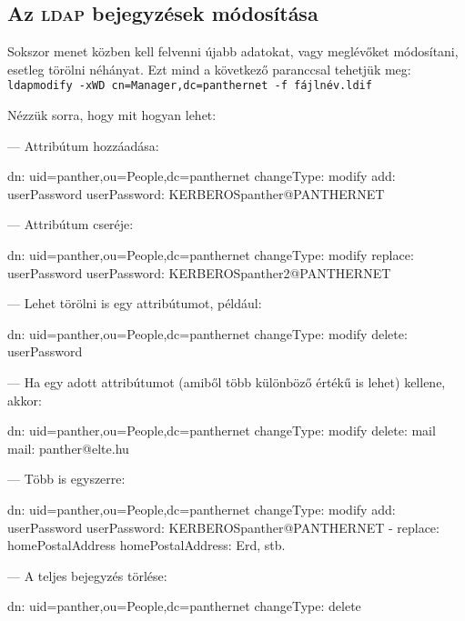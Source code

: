 \subsection{Az \textsc{ldap} bejegyzések módosítása}

Sokszor menet közben kell felvenni újabb adatokat, vagy meglévőket módosítani, esetleg törölni néhányat. Ezt mind a
következő paranccsal tehetjük meg:\\
\texttt{ldapmodify -xWD cn=Manager,dc=panthernet -f fájlnév.ldif}

Nézzük sorra, hogy mit hogyan lehet:

\noindent  --- Attribútum hozzáadása:

\begin{VerbExample}
dn: uid=panther,ou=People,dc=panthernet
changeType: modify
add: userPassword
userPassword: {KERBEROS}panther@PANTHERNET
\end{VerbExample}

\noindent --- Attribútum cseréje:
\begin{VerbExample}
dn: uid=panther,ou=People,dc=panthernet
changeType: modify
replace: userPassword
userPassword: {KERBEROS}panther2@PANTHERNET
\end{VerbExample}

\noindent --- Lehet törölni is egy attribútumot, például:

\begin{VerbExample}
dn: uid=panther,ou=People,dc=panthernet
changeType: modify
delete: userPassword
\end{VerbExample}


\noindent --- Ha egy adott attribútumot (amiből több különböző értékű is lehet) kellene, akkor:

\begin{VerbExample}
dn: uid=panther,ou=People,dc=panthernet
changeType: modify
delete: mail
mail: panther@elte.hu
\end{VerbExample}

\noindent --- Több is egyszerre:

\begin{VerbExample}
dn: uid=panther,ou=People,dc=panthernet
changeType: modify
add: userPassword
userPassword: {KERBEROS}panther@PANTHERNET
-
replace: homePostalAddress
homePostalAddress: Erd, stb.
\end{VerbExample}

\noindent --- A teljes bejegyzés törlése:
  
\begin{VerbExample}
dn: uid=panther,ou=People,dc=panthernet
changeType: delete
\end{VerbExample}




